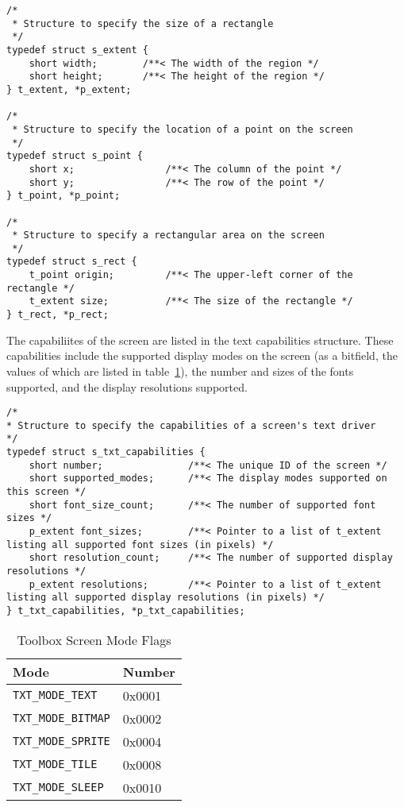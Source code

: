 \begin{lstlisting}
/*
 * Structure to specify the size of a rectangle
 */
typedef struct s_extent {
    short width;        /**< The width of the region */
    short height;       /**< The height of the region */
} t_extent, *p_extent;

/*
 * Structure to specify the location of a point on the screen
 */
typedef struct s_point {
    short x;                /**< The column of the point */
    short y;                /**< The row of the point */
} t_point, *p_point;

/*
 * Structure to specify a rectangular area on the screen
 */
typedef struct s_rect {
    t_point origin;         /**< The upper-left corner of the rectangle */
    t_extent size;          /**< The size of the rectangle */
} t_rect, *p_rect;
\end{lstlisting}

The capabiliites of the screen are listed in the text capabilities structure.
These capabilities include the supported display modes on the screen (as a bitfield, the values of which are listed in table~\ref{tbl:fnx_screen_modes}),
the number and sizes of the fonts supported, and the display resolutions supported.

\begin{lstlisting}
/*
* Structure to specify the capabilities of a screen's text driver
*/
typedef struct s_txt_capabilities {
    short number;               /**< The unique ID of the screen */
    short supported_modes;      /**< The display modes supported on this screen */
    short font_size_count;      /**< The number of supported font sizes */
    p_extent font_sizes;        /**< Pointer to a list of t_extent listing all supported font sizes (in pixels) */
    short resolution_count;     /**< The number of supported display resolutions */
    p_extent resolutions;       /**< Pointer to a list of t_extent listing all supported display resolutions (in pixels) */
} t_txt_capabilities, *p_txt_capabilities;
\end{lstlisting}

\begin{table}
	\begin{center}
		\begin{tabular}{|l|l|} \hline
			Mode & Number \\ \hline\hline
			\verb+TXT_MODE_TEXT+ & 0x0001 \\ \hline
			\verb+TXT_MODE_BITMAP+ & 0x0002 \\ \hline
			\verb+TXT_MODE_SPRITE+ & 0x0004 \\ \hline
			\verb+TXT_MODE_TILE+ & 0x0008 \\ \hline
			\verb+TXT_MODE_SLEEP+ & 0x0010 \\ \hline
		\end{tabular}
	\end{center}
	\caption{Toolbox Screen Mode Flags}
	\label{tbl:fnx_screen_modes}
\end{table}

